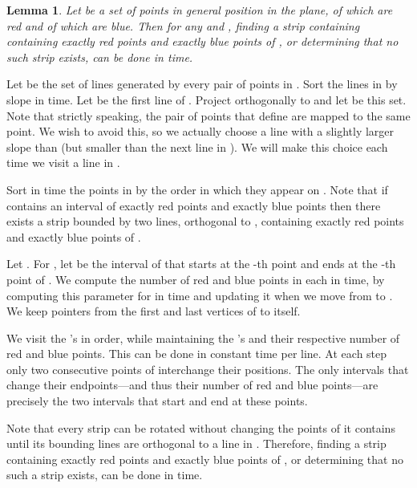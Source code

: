 \documentclass{article}
\newtheorem{lemma}[theorem]{Lemma}
\def\QED{\ensuremath{{\square}}}
\def\markatright#1{\leavevmode\unskip\nobreak\quad\hspace*{\fill}{#1}}
\newenvironment{proof}
  {\begin{trivlist}\item[\hskip\labelsep{\bf Proof.}]}
  {\markatright{\QED}\end{trivlist}}
\begin{document}
\begin{lemma}\label{lem:strips_alg}
Let  be a set of  points in general position in the plane,
 of which are red and  of which are blue.
Then for any  and , finding a strip 
containing containing exactly  red points and exactly  blue
points of , or determining that no such strip exists,
can be done in  time.
\end{lemma}
\begin{proof}

Let  be the set of lines generated by every pair of 
points in . Sort the lines in  by slope in 
time. Let  be the first line of . Project  orthogonally
to  and let  be this set. Note that strictly speaking,
 the pair of points that define  are mapped
to the same point. We wish to avoid this, so we actually choose a line with a slightly larger slope
than  (but smaller than the next line in ).
 We will make this choice each time we visit a line in .

 Sort in  time 
the points in  by the order in which they appear on . 
Note that if  contains an interval of  exactly  red points
and exactly  blue points
then there  exists a strip bounded by two lines, orthogonal to , containing 
exactly  red points and 
exactly  blue points of .

Let . For , let  be the interval of 
that starts at the -th point and ends at the -th
point of . We compute the number of red and blue points in each 
in  time, by computing this parameter for  in  time
and updating it when we move from  to .
We keep pointers from the first and last vertices
of  to itself. 

We visit the 's in order, while maintaining 
the 's and their respective number of red and blue points. This can be
done in constant time per line. At each step only two consecutive
points of  interchange their positions. The only intervals
that change their endpoints---and thus their number of red and blue
points---are precisely the two intervals that start and end at these
points.

Note that every strip can be rotated without changing
the points of  it contains until its bounding lines
are orthogonal to a line in . Therefore,
finding a strip containing
exactly  red points and exactly  blue points of , or
determining that no such a strip exists,
can be done in  time. 
\end{proof}
\end{document}
